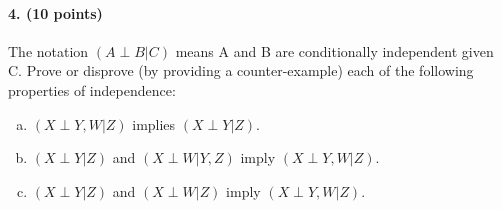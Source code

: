 \documentclass[11pt]{article}
\begin{document}
%

\paragraph{4. (10 points)} 
The notation $(A \perp B | C)$ means A and B are conditionally independent given C.
Prove or disprove (by providing a counter-example) each of the following properties of independence:
\begin{enumerate}[(a)]
\item $(X\perp  Y, W | Z)$ implies $(X\perp  Y | Z)$.
\item $(X\perp Y | Z)$ and $(X \perp W | Y,Z)$ imply $(X\perp Y,W | Z)$.
\item $(X\perp Y | Z)$ and $(X \perp W | Z)$ imply $(X\perp Y,W | Z)$.
\end{enumerate}
\end{document}
